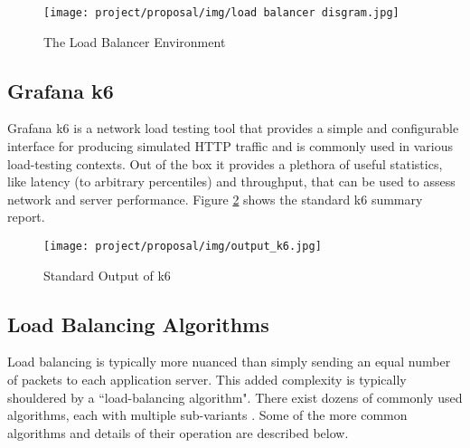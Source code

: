 \begin{figure}[H]
    \centering
    \texttt{[image: project/proposal/img/load balancer disgram.jpg]}
    \caption{The Load Balancer Environment \cite{nginxPlus}}
    \label{fig:my_label}
\end{figure}

\subsection{Grafana k6}

Grafana k6 is a network load testing tool that provides a simple and configurable interface for producing simulated HTTP traffic and is commonly used in various load-testing contexts. Out of the box it provides a plethora of useful statistics, like latency (to arbitrary percentiles) and throughput, that can be used to assess network and server performance.\cite{k6} Figure \ref{fig:k6} shows the standard k6 summary report.

\begin{figure}[H]
    \centering
    \texttt{[image: project/proposal/img/output\_k6.jpg]}
    \caption{Standard Output of k6}
    \label{fig:k6}
\end{figure}

\subsection{Load Balancing Algorithms}

Load balancing is typically more nuanced than simply sending an equal number of packets to each application server. This added complexity is typically shouldered by a ``load-balancing algorithm". There exist dozens of commonly used algorithms, each with multiple sub-variants \cite{loadBalancingAlgorithms}. Some of the more common algorithms and details of their operation are described below.

